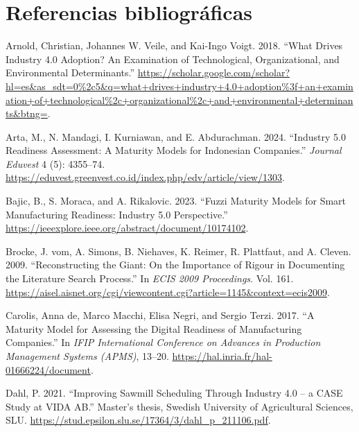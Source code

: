 \documentclass{article}
\newlength{\cslhangindent}
\newenvironment{CSLReferences}[2] %
 {\begin{list}{}{%
  \setlength{\itemindent}{0pt}
  \setlength{\leftmargin}{0pt}
  \setlength{\parsep}{0pt}
  \ifodd #1
   \setlength{\leftmargin}{\cslhangindent}
   \setlength{\itemindent}{-1\cslhangindent}
  \fi
  \setlength{\itemsep}{#2\baselineskip}}}
 {\end{list}}
\begin{document}
\section*{Referencias
bibliográficas}\label{referencias-bibliogruxe1ficas}

\label{refs}
\begin{CSLReferences}{1}{0}
Arnold, Christian, Johannes W. Veile, and Kai-Ingo Voigt. 2018. {``What
Drives Industry 4.0 Adoption? An Examination of Technological,
Organizational, and Environmental Determinants.''}
\url{https://scholar.google.com/scholar?hl=es&as_sdt=0\%2c5&q=what+drives+industry+4.0+adoption\%3f+an+examination+of+technological\%2c+organizational\%2c+and+environmental+determinants&btng=}.

Arta, M., N. Mandagi, I. Kurniawan, and E. Abdurachman. 2024.
{``Industry 5.0 Readiness Assessment: A Maturity Models for Indonesian
Companies.''} \emph{Journal Eduvest} 4 (5): 4355--74.
\url{https://eduvest.greenvest.co.id/index.php/edv/article/view/1303}.

Bajic, B., S. Moraca, and A. Rikalovic. 2023. {``Fuzzi Maturity Models
for Smart Manufacturing Readiness: Industry 5.0 Perspective.''}
\url{https://ieeexplore.ieee.org/abstract/document/10174102}.

Brocke, J. vom, A. Simons, B. Niehaves, K. Reimer, R. Plattfaut, and A.
Cleven. 2009. {``Reconstructing the Giant: On the Importance of Rigour
in Documenting the Literature Search Process.''} In \emph{ECIS 2009
Proceedings}. Vol. 161.
\url{https://aisel.aisnet.org/cgi/viewcontent.cgi?article=1145&context=ecis2009}.

Carolis, Anna de, Marco Macchi, Elisa Negri, and Sergio Terzi. 2017.
{``A Maturity Model for Assessing the Digital Readiness of Manufacturing
Companies.''} In \emph{IFIP International Conference on Advances in
Production Management Systems (APMS)}, 13--20.
\url{https://hal.inria.fr/hal-01666224/document}.

Dahl, P. 2021. {``Improving Sawmill Scheduling Through Industry 4.0 -- a
CASE Study at VIDA AB.''} Master's thesis, Swedish University of
Agricultural Sciences, SLU.
\url{https://stud.epsilon.slu.se/17364/3/dahl_p_211106.pdf}.

\end{CSLReferences}



\end{document}
